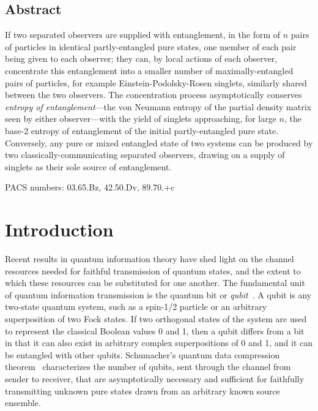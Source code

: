 \maketitle
 
\thispagestyle{empty}
 
\subsection*{\centering Abstract}
{If two separated observers are supplied with entanglement, in the form
of $n$ pairs of particles in identical partly-entangled pure states,
one member of each pair being given to each observer; they can, by
local actions of each observer, concentrate this entanglement into
a smaller number of maximally-entangled pairs of particles,
for example Einstein-Podolsky-Rosen singlets, similarly shared between
the two observers.  The concentration process asymptotically
conserves {\em entropy of entanglement}---the von Neumann entropy of
the partial density matrix seen by either observer---with the yield of
singlets approaching, for large $n$, the base-2 entropy of
entanglement of the initial partly-entangled pure state.  Conversely,
any pure or mixed entangled state of two systems can be produced by
two classically-communicating separated observers, drawing on a
supply of singlets as their sole source of entanglement.}
 
\vfill
 
PACS numbers: 03.65.Bz, 42.50.Dv, 89.70.+c\vfill
 
\section{Introduction}
 
Recent results in quantum information theory have shed light on
the channel resources needed for faithful transmission of
quantum states, and the extent to which these resources can be
substituted for one another.
The fundamental unit of quantum information transmission is
the quantum bit or {\em qubit\/}~\cite{Schu95}.
A qubit is any two-state
quantum system, such as a spin-1/2 particle or an arbitrary superposition of
two Fock states.  If two orthogonal states of the system are used to represent
the classical Boolean values 0 and 1, then a qubit differs from a bit in that it
can also exist in arbitrary complex superpositions of 0 and 1, and it can be
entangled with other qubits.  Schumacher's quantum data compression
theorem~\cite{Schu95,JS94} characterizes the number of
qubits, sent through the channel from sender to
receiver, that are asymptotically necessary and
sufficient for faithfully transmitting unknown pure states
drawn from an arbitrary known source ensemble.

